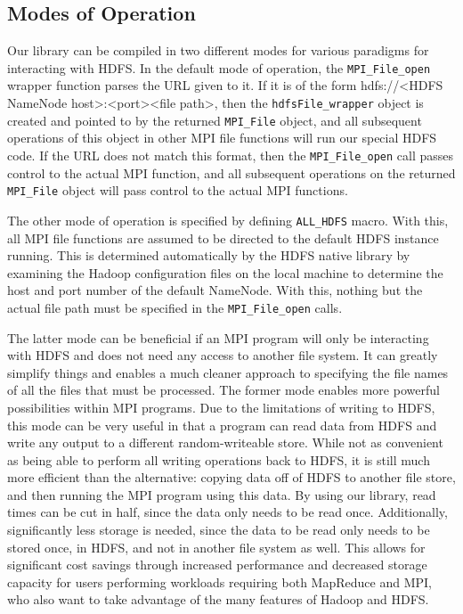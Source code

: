 \subsection{Modes of Operation}
Our library can be compiled in two different modes for various paradigms for interacting with HDFS. In the default mode of operation, the \texttt{MPI\_File\_open} wrapper function parses the URL given to it. If it is of the form hdfs://<HDFS NameNode host>:<port><file path>, then the \texttt{hdfsFile\_wrapper} object is created and pointed to by the returned \texttt{MPI\_File} object, and all subsequent operations of this object in other MPI file functions will run our special HDFS code. If the URL does not match this format, then the \texttt{MPI\_File\_open} call passes control to the actual MPI function, and all subsequent operations on the returned \texttt{MPI\_File} object will pass control to the actual MPI functions. 

The other mode of operation is specified by defining \texttt{ALL\_HDFS} macro. With this, all MPI file functions are assumed to be directed to the default HDFS instance running. This is determined automatically by the HDFS native library by examining the Hadoop configuration files on the local machine to determine the host and port number of the default NameNode. With this, nothing but the actual file path must be specified in the \texttt{MPI\_File\_open} calls. 

The latter mode can be beneficial if an MPI program will only be interacting with HDFS and does not need any access to another file system. It can greatly simplify things and enables a much cleaner approach to specifying the file names of all the files that must be processed. The former mode enables more powerful possibilities within MPI programs. Due to the limitations of writing to HDFS, this mode can be very useful in that a program can read data from HDFS and write any output to a different random-writeable store. While not as convenient as being able to perform all writing operations back to HDFS, it is still much more efficient than the alternative: copying data off of HDFS to another file store, and then running the MPI program using this data. By using our library, read times can be cut in half, since the data only needs to be read once. Additionally, significantly less storage is needed, since the data to be read only needs to be stored once, in HDFS, and not in another file system as well. This allows for significant cost savings through increased performance and decreased storage capacity for users performing workloads requiring both MapReduce and MPI, who also want to take advantage of the many features of Hadoop and HDFS.